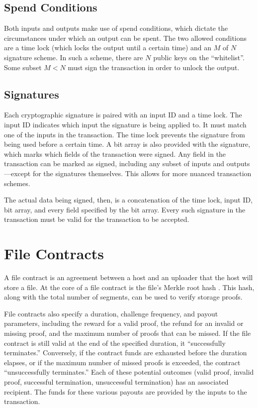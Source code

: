 \documentclass[twocolumn]{article}
\begin{document}
\subsection{Spend Conditions}
Both inputs and outputs make use of spend conditions, which dictate the circumstances under which an output can be spent.
The two allowed conditions are a time lock (which locks the output until a certain time) and an $M$ of $N$ signature scheme.
In such a scheme, there are $N$ public keys on the ``whitelist''.
Some subset $M < N$ must sign the transaction in order to unlock the output. 

\subsection{Signatures}
Each cryptographic signature is paired with an input ID and a time lock. 
The input ID indicates which input the signature is being applied to.
It must match one of the inputs in the transaction.
The time lock prevents the signature from being used before a certain time.
A bit array is also provided with the signature, which marks which fields of the transaction were signed.
Any field in the transaction can be marked as signed, including any subset of inputs and outputs---except for the signatures themselves.
This allows for more nuanced transaction schemes.

The actual data being signed, then, is a concatenation of the time lock, input ID, bit array, and every field specified by the bit array.
Every such signature in the transaction must be valid for the transaction to be accepted.

\section{File Contracts}
\label{sec:contracts}
A file contract is an agreement between a host and an uploader that the host will store a file.
At the core of a file contract is the file's Merkle root hash \cite{merkle}.
This hash, along with the total number of segments, can be used to verify storage proofs.

File contracts also specify a duration, challenge frequency, and payout parameters, including the reward for a valid proof, the refund for an invalid or missing proof, and the maximum number of proofs that can be missed.
If the file contract is still valid at the end of the specified duration, it ``successfully terminates.''
Conversely, if the contract funds are exhausted before the duration elapses, or if the maximum number of missed proofs is exceeded, the contract ``unsuccessfully terminates.''
Each of these potential outcomes (valid proof, invalid proof, successful termination, unsuccessful termination) has an associated recipient.
The funds for these various payouts are provided by the inputs to the transaction.
\end{document}
